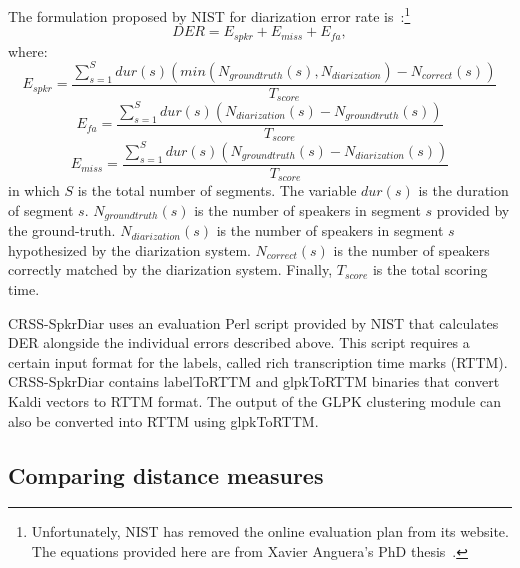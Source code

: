 The formulation proposed by NIST for diarization error rate is~\cite{anguera2012diarization}:\footnote{Unfortunately, NIST has removed the online evaluation plan from its website. The equations provided here are from Xavier Anguera's PhD thesis~\cite{anguera2007phd}.}
\begin{equation}
DER = E_{spkr} + E_{miss} + E_{fa}, 
\end{equation}
where: 
\begin{equation}
E_{spkr} = \frac{\sum\limits_{s=1}^{S} dur(s)(min(N_{groundtruth}(s),N_{diarization})-N_{correct}(s))}{T_{score}}
\end{equation}
\begin{equation}
E_{fa} = \frac{\sum\limits_{s=1}^S dur(s)(N_{diarization}(s)-N_{groundtruth}(s))}{T_{score}}
\end{equation}
\begin{equation}
E_{miss} = \frac{\sum\limits_{s=1}^S dur(s)(N_{groundtruth}(s) - N_{diarization}(s))}{T_{score}}
\end{equation}
in which $S$ is the total number of segments. The variable $dur(s)$ is the duration of segment $s$. $N_{groundtruth}(s)$ is the number of speakers in segment $s$ provided by the ground-truth. 
$N_{diarization}(s)$ is the number of speakers in segment $s$ hypothesized by the diarization system. 
$N_{correct}(s)$ is the number of speakers correctly matched by the diarization system. 
Finally, $T_{score}$ is the total scoring time. 

CRSS-SpkrDiar uses an evaluation Perl script provided by NIST that calculates DER alongside the individual errors described above. 
This script requires a certain input format for the labels, called rich transcription time marks (RTTM). 
CRSS-SpkrDiar contains labelToRTTM and glpkToRTTM binaries that convert Kaldi vectors to RTTM format. 
The output of the GLPK clustering module can also be converted into RTTM using glpkToRTTM. 

\subsection{Comparing distance measures}

